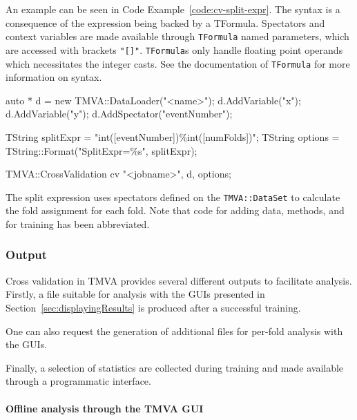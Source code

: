 An example can be seen in Code Example~\ref{code:cv-split-expr}. The syntax is a consequence of the expression being backed by a TFormula. Spectators and context variables are made available through \texttt{TFormula} named parameters, which are accessed with brackets \texttt{"[]"}. \texttt{TFormula}s only handle floating point operands which necessitates the integer casts. See the documentation of \texttt{TFormula} for more information on syntax.

\begin{codeexample}
\begin{tmvacode}
auto * d = new TMVA::DataLoader("<name>");
d.AddVariable("x");
d.AddVariable("y");
d.AddSpectator("eventNumber");

TString splitExpr = "int([eventNumber])\%int([numFolds])";
TString options = TString::Format("SplitExpr=\%s", splitExpr);

TMVA::CrossValidation cv {"<jobname>", d, options};
\end{tmvacode}
\caption[.]{\codeexampleCaptionSize The split expression uses spectators defined on the \texttt{TMVA::DataSet} to calculate the fold assignment for each fold. Note that code for adding data, methods, and for training has been abbreviated.
}
\label{code:cv-split-expr}
\end{codeexample}










\subsubsection{Output}
\label{sec:cv-output}
Cross validation in TMVA provides several different outputs to facilitate analysis. Firstly, a file suitable for analysis with the GUIs presented in Section~\ref{sec:displayingResults} is produced after a successful training.

One can also request the generation of additional files for per-fold analysis with the GUIs.

Finally, a selection of statistics are collected during training and made available through a programmatic interface.

\paragraph{Offline analysis through the TMVA GUI}
\label{sec:cv-output-files}

